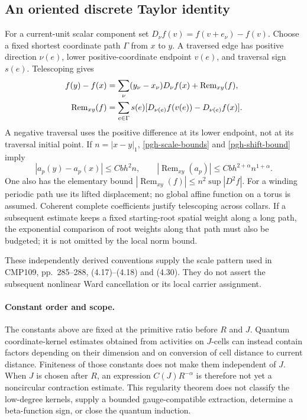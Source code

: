 \subsection{An oriented discrete Taylor identity}
\label{pgh-taylor-section}

For a current-unit scalar component set
$D_\nu f(v)=f(v+e_\nu)-f(v)$. Choose a fixed shortest coordinate
path $\Gamma$ from $x$ to $y$. A traversed edge has positive
direction $\nu(e)$, lower positive-coordinate endpoint $v(e)$,
and traversal sign $s(e)$. Telescoping gives
\begin{align}
 f(y)-f(x)&=\sum_\nu(y_\nu-x_\nu)D_\nu f(x)
                         +\operatorname{Rem}_{xy}(f),\notag\\
 \operatorname{Rem}_{xy}(f)
 &=\sum_{e\in\Gamma}s(e)
       [D_{\nu(e)}f(v(e))-D_{\nu(e)}f(x)].
 \label{pgh-taylor}
\end{align}
A negative traversal uses the positive difference at its lower
endpoint, not at its traversal initial point. If $n=|x-y|_1$,
\eqref{pgh-scale-bounds} and \eqref{pgh-shift-bound} imply
\begin{equation}
 |a_p(y)-a_p(x)|\le Cbh^2n,\qquad
 |\operatorname{Rem}_{xy}(a_p)|
                      \le Cbh^{2+\alpha}n^{1+\alpha}.
 \label{pgh-taylor-bound}
\end{equation}
One also has the elementary bound
$|\operatorname{Rem}_{xy}(f)|\le n^2\sup|D^2f|$.
For a winding periodic path use its lifted displacement;
no global affine function on a torus is assumed. Coherent complete
coefficients justify telescoping across collars. If a subsequent
estimate keeps a fixed starting-root spatial weight along a long
path, the exponential comparison of root weights along that path
must also be budgeted; it is not omitted by the local norm bound.

These independently derived conventions supply the scale
pattern used in CMP109, pp.~285--288,
(4.17)--(4.18) and (4.30). They do not assert the subsequent
nonlinear Ward cancellation or its local carrier assignment.

\paragraph{Constant order and scope.}
The constants above are fixed at the primitive ratio before
$R$ and $J$. Quantum coordinate-kernel estimates obtained from
activities on $J$-cells can instead contain factors depending
on their dimension and on conversion of cell distance to
current distance. Finiteness of those constants does not make
them independent of $J$. When $J$ is chosen after $R$, an
expression $C(J)R^{-\alpha}$ is therefore not yet a
noncircular contraction estimate. This regularity theorem
does not classify the low-degree kernels, supply a bounded
gauge-compatible extraction, determine a beta-function sign,
or close the quantum induction.
